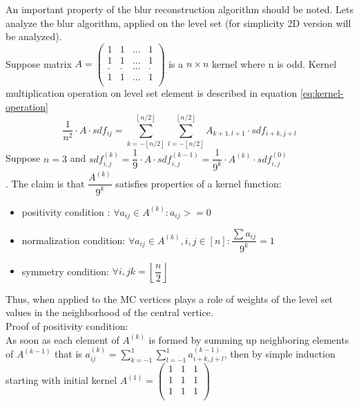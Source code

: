 An important property of the blur reconstruction algorithm should be noted. Lets analyze the blur algorithm, applied on the level set (for simplicity 2D version will be analyzed).\\
Suppose matrix $A = 
\begin{pmatrix}
	1 & 1 & ... & 1\\
	1 & 1 & ... & 1\\
	. & . & ... & .\\
	1 & 1 & ... & 1\\
\end{pmatrix}$ is a $n \times n$ kernel where n is odd.
Kernel multiplication operation on level set element is described in equation \ref{eq:kernel-operation}
\begin{equation}
	\dfrac{1}{n^2}\cdot A\cdot sdf_{ij} = \sum_{k=- \left \lfloor{n/2}\right \rfloor}^{\left \lfloor{n/2}\right \rfloor}
		{\sum_{l=- \left \lfloor{n/2}\right \rfloor}^{\left \lfloor{n/2}\right \rfloor}{ A_{k+1, l+1} \cdot sdf_{i+k, j+l}}}
	\label{eq:kernel-operation}
\end{equation}
Suppose $n=3$ and $ sdf^{(k)}_{i,j} = \dfrac{1}{9} \cdot A \cdot sdf^{(k-1)}_{i,j} = \dfrac{1}{9^k} \cdot A^{(k)} \cdot sdf^{(0)}_{i,j}$\\. The claim is that $\dfrac{A^{(k)}}{9^k}$ satisfies properties of a kernel function:
\begin{itemize}
	\item positivity condition : $\forall a_{ij} \in A^(k): a_{ij} >= 0$
	\item normalization condition: $\forall a_{ij} \in A^(k), i,j \in [n]: \dfrac{\sum{a_{ij}}}{9^k} = 1$
	\item symmetry condition: $\forall i,j k=\left \lfloor{\dfrac{n}{2}}\right \rfloor $
\end{itemize}
Thus, when applied to the MC vertices plays a role of weights of the level set values in the neighborhood of the central vertice.\\
Proof of positivity condition:\\
As soon as each element of $A^{(k)}$ is formed by summing up neighboring elements of $A^{(k-1)}$ that is $a_{ij}^{(k)} = \sum_{k=-1}^{1}{\sum_{l=-1}^{1}{a^{(k-1)}_{i+k, j+l}}}$, then by simple induction starting with initial kernel $A^(1)=
\begin{pmatrix}
1 & 1 & 1\\
1 & 1 & 1\\
1 & 1 & 1\\
\end{pmatrix}$
